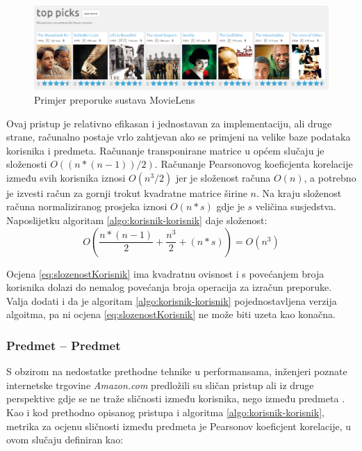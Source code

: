 \documentclass[times, utf8, diplomski, numeric]{fer}
\begin{document}
\begin{figure}[!htb]
	\centering
	\includegraphics[width=14.21cm]{images/collaborative/movielens.png}
	\caption{Primjer preporuke sustava \glqq MovieLens\grqq}
	\label{fig:movielens}
\end{figure}

Ovaj pristup je relativno efikasan i jednostavan za implementaciju, ali druge
strane, računalno postaje vrlo zahtjevan ako se primjeni na velike baze podataka
korisnika i predmeta. Računanje transponirane matrice u općem slučaju je
složenosti $O((n \ast (n-1)) / 2)$. Računanje Pearsonovog koeficjenta korelacije
između svih korisnika iznosi $O(n^3 / 2)$ jer je složenost računa $O(n)$, a
potrebno je izvesti račun za gornji trokut kvadratne matrice širine $n$. Na
kraju složenost računa normaliziranog prosjeka iznosi $O(n * s)$ gdje je $s$
veličina susjedstva. Naposlijetku algoritam \ref{algo:korisnik-korisnik} daje
složenost:
\begin{equation}
\label{eq:slozenostKorisnik}
	O(
		\frac{n \ast (n-1)}{2} + 
		\frac{n^3}{2} + 
		(n \ast s)
	) = O(n^3)
\end{equation}

Ocjena \ref{eq:slozenostKorisnik} ima kvadratnu ovisnost i s povećanjem broja
korisnika dolazi do nemalog povećanja broja operacija za izračun preporuke. 
Valja dodati i da je algoritam \ref{algo:korisnik-korisnik} pojednostavljena
verzija algoitma, pa ni ocjena \ref{eq:slozenostKorisnik} ne može biti uzeta
kao konačna.

\subsubsection{Predmet -- Predmet}
S obzirom na nedostatke prethodne tehnike u performansama, inženjeri poznate
internetske trgovine \emph{Amazon.com} predložili su sličan pristup ali iz druge
perspektive gdje se ne traže sličnosti između korisnika, nego između predmeta
\cite{amazon}. Kao i kod prethodno opisanog pristupa i algoritma
\ref{algo:korisnik-korisnik}, metrika za ocjenu sličnosti između predmeta je
Pearsonov koeficjent korelacije, u ovom slučaju definiran kao:
\end{document}
